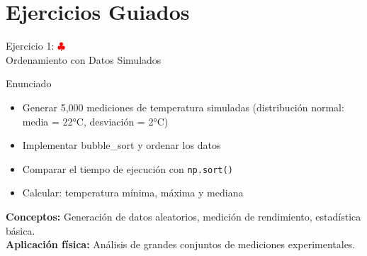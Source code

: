 \documentclass[10pt]{beamer}
\begin{document}
\section{Ejercicios Guiados}

\begin{frame}[fragile]{Ejercicio 1: \hfill \textcolor{red}{$\clubsuit$} \\ Ordenamiento con Datos Simulados}
  \begin{block}{Enunciado}
    \begin{itemize}
      \item Generar 5,000 mediciones de temperatura simuladas (distribución normal: media = 22°C, desviación = 2°C)
      \item Implementar bubble\_sort y ordenar los datos
      \item Comparar el tiempo de ejecución con \texttt{np.sort()}
      \item Calcular: temperatura mínima, máxima y mediana
    \end{itemize}
  \end{block}
  
  \textbf{Conceptos:} Generación de datos aleatorios, medición de rendimiento, estadística básica.
  \\
  \textbf{Aplicación física:} Análisis de grandes conjuntos de mediciones experimentales.
\end{frame}
\end{document}
